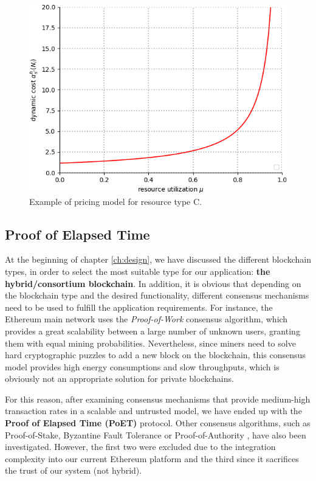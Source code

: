 \begin{figure}[bth]
	\centering
	\includegraphics[scale=0.7]{gfx/pricing_model.png}    
  	\caption{Example of pricing model for resource type C.}
  	\label{fig:pricing_model}
\end{figure}

\subsection{Proof of Elapsed Time} \label{poet}

At the beginning of chapter \ref{ch:design}, we have discussed the different blockchain types, in order to select the most suitable type for our application: \textbf{the hybrid/consortium blockchain}. In addition, it is obvious that depending on the blockchain type and the desired functionality, different consensus mechanisms need to be used to fulfill the application requirements. For instance, the Ethereum main network uses the \textit{Proof-of-Work} consensus algorithm, which provides a great scalability between a large number of unknown users, granting them with equal mining probabilities. Nevertheless, since miners need to solve hard cryptographic puzzles to add a new block on the blockchain, this consensus model provides high energy consumptions and slow throughputs, which is obviously not an appropriate solution for private blockchains.

For this reason, after examining consensus mechanisms that provide medium-high transaction rates in a scalable and untrusted model, we have ended up with the \textbf{Proof of Elapsed Time (PoET)} protocol. Other consensus algorithms, such as Proof-of-Stake, Byzantine Fault Tolerance or Proof-of-Authority \citep{baliga2017understanding}, have also been investigated. However, the first two were excluded due to the integration complexity into our current Ethereum platform and the third since it sacrifices the trust of our system (not hybrid).

